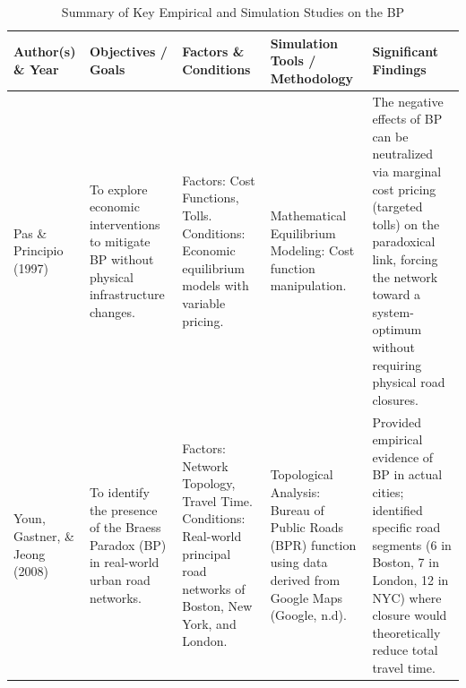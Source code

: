 \begin{landscape}

\begin{table}[p]
    \hspace*{2cm}
    \begin{minipage}{\dimexpr\linewidth-2cm\relax}
 
        \vspace{0.25cm}
        \begin{tabularx}{\linewidth}{|p{2.5cm}|X|X|X|X|}
        \hline
        \textbf{Author(s) \& Year} & \textbf{Objectives / Goals} & \textbf{Factors \& Conditions} & \textbf{Simulation Tools / Methodology} & \textbf{Significant Findings} \\
        \hline
        Pas \& Principio (1997) & To explore economic interventions to mitigate BP without physical infrastructure changes. & Factors: Cost Functions, Tolls. \newline \newline Conditions: Economic equilibrium models with variable pricing. & Mathematical Equilibrium Modeling: Cost function manipulation. & The negative effects of BP can be neutralized via marginal cost pricing (targeted tolls) on the paradoxical link, forcing the network toward a system-optimum without requiring physical road closures. \\
        \hline
        Youn, Gastner, \& Jeong (2008) & To identify the presence of the Braess Paradox (BP) in real-world urban road networks. & Factors: Network Topology, Travel Time. \newline \newline Conditions: Real-world principal road networks of Boston, New York, and London. & Topological Analysis: Bureau of Public Roads (BPR) function using data derived from Google Maps (Google, n.d). & Provided empirical evidence of BP in actual cities; identified specific road segments (6 in Boston, 7 in London, 12 in NYC) where closure would theoretically reduce total travel time. \\
        \hline
        \end{tabularx}
        \caption{Summary of Key Empirical and Simulation Studies on the BP} 
    \end{minipage}
    
\end{table}

\begin{table}[p]
    \ContinuedFloat
    \hspace*{2cm}%
    \begin{minipage}{\dimexpr\linewidth-2cm\relax}


\end{minipage}
\end{table}
\end{landscape}
